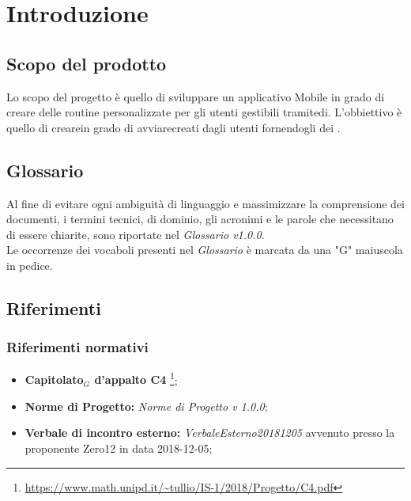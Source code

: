 \chapter{Introduzione}

\section{Scopo del prodotto}
Lo scopo del progetto è quello di sviluppare un applicativo Mobile in grado di creare delle routine personalizzate per gli utenti gestibili tramitedi. L'obbiettivo è quello di crearein grado di avviarecreati dagli utenti fornendogli dei .
\section{Glossario}
Al fine di evitare ogni ambiguità di linguaggio e massimizzare la comprensione dei documenti, i termini tecnici, di dominio, gli acronimi e le parole che necessitano di essere chiarite, sono riportate nel \textit{Glossario v1.0.0}.\\
Le occorrenze dei vocaboli presenti nel \textit{Glossario} è marcata da una "G" maiuscola in pedice.

\section{Riferimenti}

\subsection{Riferimenti normativi}
\begin{itemize}
	
	\item \textbf{Capitolato$_{G}$ d'appalto C4} \footnote{\url{https://www.math.unipd.it/~tullio/IS-1/2018/Progetto/C4.pdf}};
	\item \textbf{Norme di Progetto:} \textit{Norme di Progetto v 1.0.0};
	\item \textbf{Verbale di incontro esterno:} \textit{VerbaleEsterno20181205} avvenuto presso la proponente Zero12 in data 2018-12-05;

\end{itemize}

